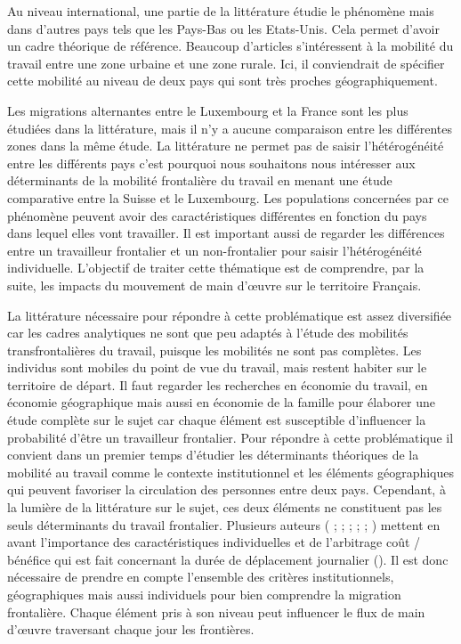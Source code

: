 \documentclass[12pt]{article}
\begin{document}
Au niveau international, une partie de la littérature étudie le phénomène mais dans d’autres pays tels que les Pays-Bas ou les Etats-Unis. Cela permet d’avoir un cadre théorique de référence. Beaucoup d’articles s’intéressent à la mobilité du travail entre une zone urbaine et une zone rurale. Ici, il conviendrait de spécifier cette mobilité au niveau de deux pays qui sont très proches géographiquement.

Les migrations alternantes entre le Luxembourg et la France sont les plus étudiées dans la littérature, mais il n’y a aucune comparaison entre les différentes zones dans la même étude. La littérature ne permet pas de saisir l’hétérogénéité entre les différents pays c’est pourquoi nous souhaitons nous intéresser aux déterminants de la mobilité frontalière du travail en menant une étude comparative entre la Suisse et le Luxembourg. Les populations concernées par ce phénomène peuvent avoir des caractéristiques différentes en fonction du pays dans lequel elles vont travailler. Il est important aussi de regarder les différences entre un travailleur frontalier et un non-frontalier pour saisir l’hétérogénéité individuelle. L’objectif de traiter cette thématique est de comprendre, par la suite, les impacts du mouvement de main d’œuvre sur le territoire Français.

La littérature nécessaire pour répondre à cette problématique est assez diversifiée car les cadres analytiques ne sont que peu adaptés à l’étude des mobilités transfrontalières du travail, puisque les mobilités ne sont pas complètes. Les individus sont mobiles du point de vue du travail, mais restent habiter sur le territoire de départ. Il faut regarder les recherches en économie du travail, en économie géographique mais aussi  en économie de la famille pour élaborer une étude complète sur le sujet car chaque élément est susceptible d’influencer la probabilité d’être un travailleur frontalier.
Pour répondre à cette problématique il convient dans un premier temps d’étudier les déterminants théoriques de la mobilité au travail comme le contexte institutionnel et les éléments géographiques qui peuvent favoriser la circulation des personnes entre deux pays. Cependant, à la lumière de la littérature sur le sujet, ces deux éléments ne constituent pas les seuls déterminants du travail frontalier. Plusieurs auteurs (\cite{Levy1985} \cite{White1986}  ; \cite{Rouwendal1999}; \cite{Gorter1997} ; \cite{Lee2003} ; \cite{Mathias2003} ; \cite{Corvers2003}) mettent en avant l’importance des caractéristiques individuelles et de l’arbitrage coût / bénéfice qui est fait concernant la durée de déplacement journalier (\cite{Mougenot1985}). Il est donc nécessaire de prendre en compte l’ensemble des critères institutionnels, géographiques mais aussi individuels pour bien comprendre la migration frontalière. Chaque élément pris à son niveau peut influencer le flux de main d’œuvre traversant chaque jour les frontières.
\end{document}
